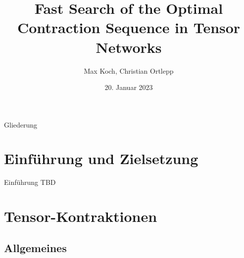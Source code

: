 \documentclass{beamer}
\title{Fast Search of the Optimal Contraction Sequence in Tensor Networks}
\author{Max Koch, Christian Ortlepp}
\institute{Friedrich-Schiller-Universität Jena}
\date{20. Januar 2023}
\begin{document}
\begin{frame}
	\titlepage
\end{frame}

\begin{frame}{Gliederung}
	\tableofcontents
\end{frame}

\section{Einführung und Zielsetzung}
\begin{frame}{Einführung}
	TBD
\end{frame}

\section{Tensor-Kontraktionen}
\subsection{Allgemeines}
\end{document}
